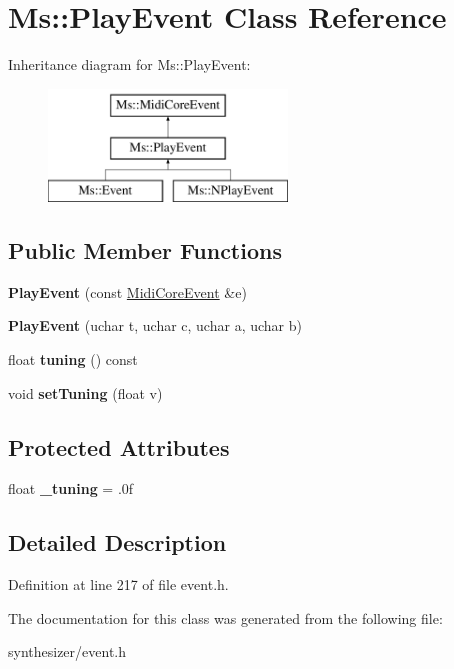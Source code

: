 \hypertarget{class_ms_1_1_play_event}{}\section{Ms\+:\+:Play\+Event Class Reference}
\label{class_ms_1_1_play_event}
Inheritance diagram for Ms\+:\+:Play\+Event\+:\begin{figure}[H]
\begin{center}
\leavevmode
\includegraphics[height=3.000000cm]{class_ms_1_1_play_event}
\end{center}
\end{figure}
\subsection*{Public Member Functions}
\begin{DoxyCompactItemize}
\item 
\mbox{\label{class_ms_1_1_play_event_afa4a4125388561a5ff819ef58a44563d}} 
{\bfseries Play\+Event} (const \hyperlink{class_ms_1_1_midi_core_event}{Midi\+Core\+Event} \&e)
\item 
\mbox{\label{class_ms_1_1_play_event_ae5dd50a91fe5ee4b819b9b01efd4bc95}} 
{\bfseries Play\+Event} (uchar t, uchar c, uchar a, uchar b)
\item 
\mbox{\label{class_ms_1_1_play_event_a6eae8e59a1f66766bbb97a891e64d585}} 
float {\bfseries tuning} () const
\item 
\mbox{\label{class_ms_1_1_play_event_ae6375130e9a36a13b2f29b5e57f67452}} 
void {\bfseries set\+Tuning} (float v)
\end{DoxyCompactItemize}
\subsection*{Protected Attributes}
\begin{DoxyCompactItemize}
\item 
\mbox{\label{class_ms_1_1_play_event_adc84b06fd36463ad6fc18af956080729}} 
float {\bfseries \+\_\+tuning} = .\+0f
\end{DoxyCompactItemize}


\subsection{Detailed Description}


Definition at line 217 of file event.\+h.



The documentation for this class was generated from the following file\+:\begin{DoxyCompactItemize}
\item 
synthesizer/event.\+h\end{DoxyCompactItemize}
